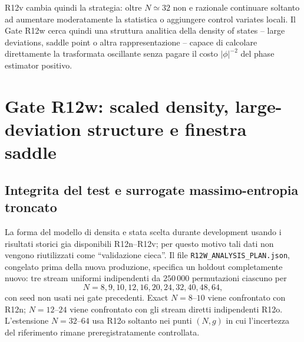 \documentclass[11pt,a4paper]{article}
\begin{document}
R12v cambia quindi la strategia: oltre $N\simeq32$ non e razionale continuare soltanto ad aumentare moderatamente la statistica o aggiungere control variates locali. Il Gate R12w cerca quindi una struttura analitica della density of states -- large deviations, saddle point o altra rappresentazione -- capace di calcolare direttamente la trasformata oscillante senza pagare il costo $|\phi|^{-2}$ del phase estimator positivo.

\section{Gate R12w: scaled density, large-deviation structure e finestra saddle}

\subsection{Integrita del test e surrogate massimo-entropia troncato}

La forma del modello di densita e stata scelta durante development usando i risultati storici gia disponibili R12n--R12v; per questo motivo tali dati non vengono riutilizzati come ``validazione cieca''. Il file \texttt{R12W\_ANALYSIS\_PLAN.json}, congelato prima della nuova produzione, specifica un holdout completamente nuovo: tre stream uniformi indipendenti da $250\,000$ permutazioni ciascuno per
\begin{equation}
N=8,9,10,12,16,20,24,32,40,48,64,
\end{equation}
con seed non usati nei gate precedenti. Exact $N=8$--$10$ viene confrontato con R12n; $N=12$--$24$ viene confrontato con gli stream diretti indipendenti R12o. L'estensione $N=32$--$64$ usa R12o soltanto nei punti $(N,g)$ in cui l'incertezza del riferimento rimane preregistratamente controllata.
\end{document}
